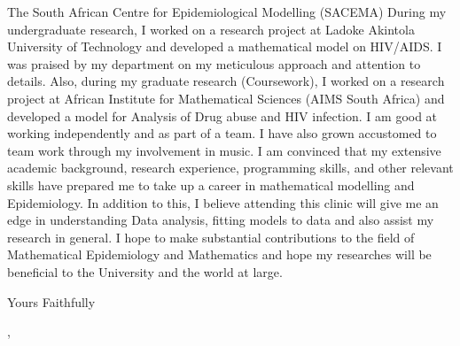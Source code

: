 \documentclass{letter} %
\begin{document}
\begin{letter}{The South African Centre for Epidemiological Modelling (SACEMA)}
\noindent During my undergraduate research, I worked on a research project at Ladoke Akintola University of Technology and developed a mathematical model on HIV/AIDS. I was praised by my department on my meticulous approach and attention to details. Also, during my graduate research (Coursework), I worked on a research project at African Institute for Mathematical Sciences (AIMS South Africa) and developed a model for Analysis of Drug abuse and HIV infection. I am good at working independently and as part of a team. I have also grown accustomed to team work through my involvement in  music. I am convinced that my extensive academic background, research experience, programming skills, and other relevant skills have prepared me to take up a career in mathematical modelling and Epidemiology. In addition to this, I believe attending this clinic will give me an edge in understanding Data analysis, fitting models to data and also assist my research in general. I hope to make substantial contributions to the field of Mathematical Epidemiology and Mathematics and hope my researches will be beneficial to the University and the world at large. 
\closing{Yours Faithfully},
\end{letter}
\end{document}
